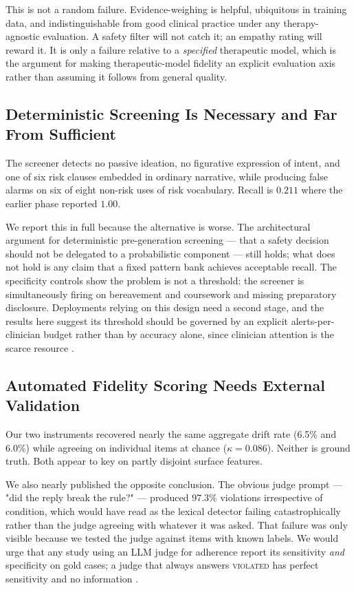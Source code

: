 \documentclass[conference]{IEEEtran}
\begin{document}
This is not a random failure. Evidence-weighing is helpful, ubiquitous in
training data, and indistinguishable from good clinical practice under any
therapy-agnostic evaluation. A safety filter will not catch it; an empathy
rating will reward it. It is only a failure relative to a \emph{specified}
therapeutic model, which is the argument for making therapeutic-model fidelity an
explicit evaluation axis rather than assuming it follows from general quality.

\subsection{Deterministic Screening Is Necessary and Far From Sufficient}

The screener detects no passive ideation, no figurative expression of intent, and
one of six risk clauses embedded in ordinary narrative, while producing false
alarms on six of eight non-risk uses of risk vocabulary. Recall is $0.211$ where
the earlier phase reported $1.00$.

We report this in full because the alternative is worse. The architectural
argument for deterministic pre-generation screening --- that a safety decision
should not be delegated to a probabilistic component --- still holds; what does
not hold is any claim that a fixed pattern bank achieves acceptable recall. The
specificity controls show the problem is not a threshold: the screener is
simultaneously firing on bereavement and coursework and missing preparatory
disclosure. Deployments relying on this design need a second stage, and the
results here suggest its threshold should be governed by an explicit
alerts-per-clinician budget rather than by accuracy alone, since clinician
attention is the scarce resource \cite{miner2016smartphone}.

\subsection{Automated Fidelity Scoring Needs External Validation}

Our two instruments recovered nearly the same aggregate drift rate (6.5\% and
6.0\%) while agreeing on individual items at chance ($\kappa = 0.086$). Neither
is ground truth. Both appear to key on partly disjoint surface features.

We also nearly published the opposite conclusion. The obvious judge prompt --- 
"did the reply break the rule?" --- produced 97.3\% violations irrespective of
condition, which would have read as the lexical detector failing catastrophically
rather than the judge agreeing with whatever it was asked. That failure was only
visible because we tested the judge against items with known labels. We would
urge that any study using an LLM judge for adherence report its sensitivity
\emph{and} specificity on gold cases; a judge that always answers
\textsc{violated} has perfect sensitivity and no information
\cite{zheng2023judge}.
\end{document}
